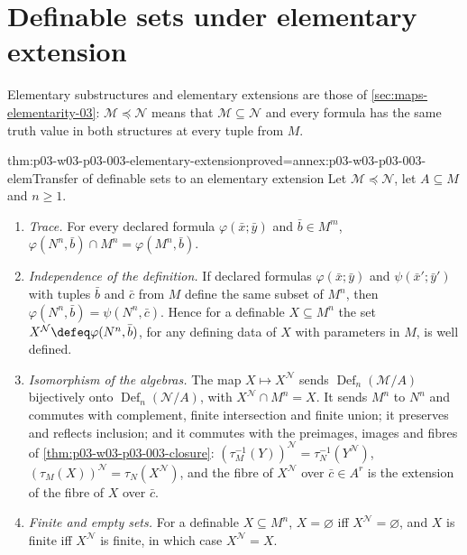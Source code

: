 \section{Definable sets under elementary extension}
\label{sec:p03-w03-p03-003-extension}

Elementary substructures and elementary extensions are those of
\cref{sec:maps-elementarity-03}: \(\mathcal M\preccurlyeq\mathcal N\) means
that \(\mathcal M\subseteq\mathcal N\) and every formula has the same truth
value in both structures at every tuple from \(M\).

\begin{hbtheorem}{thm:p03-w03-p03-003-elementary-extension}{proved=annex:p03-w03-p03-003-elem}{Transfer of definable sets to an elementary extension}
Let \(\mathcal M\preccurlyeq\mathcal N\), let \(A\subseteq M\) and
\(n\geq1\).
\begin{enumerate}
 \item \emph{Trace.}  For every declared formula \(\varphi(\bar x;\bar y)\)
       and \(\bar b\in M^m\),
       \(\varphi(N^n,\bar b)\cap M^n=\varphi(M^n,\bar b)\).
 \item \emph{Independence of the definition.}  If declared formulas
       \(\varphi(\bar x;\bar y)\) and \(\psi(\bar x';\bar y')\) with tuples
       \(\bar b\) and \(\bar c\) from \(M\) define the same subset of
       \(M^n\), then \(\varphi(N^n,\bar b)=\psi(N^n,\bar c)\).
       Hence for a definable \(X\subseteq M^n\) the set
       \(X^{\mathcal N}\defeq\varphi(N^n,\bar b)\), for any defining data
       of \(X\) with parameters in \(M\), is well defined.
 \item \emph{Isomorphism of the algebras.}  The map
       \(X\mapsto X^{\mathcal N}\) sends
       \(\operatorname{Def}_n(\mathcal M/A)\) bijectively onto
       \(\operatorname{Def}_n(\mathcal N/A)\), with
       \(X^{\mathcal N}\cap M^n=X\).  It sends \(M^n\) to \(N^n\) and
       commutes with complement, finite intersection and finite union; it
       preserves and reflects inclusion; and it commutes with the preimages,
       images and fibres of \cref{thm:p03-w03-p03-003-closure}:
       \((\tau_M^{-1}(Y))^{\mathcal N}=\tau_N^{-1}(Y^{\mathcal N})\),
       \((\tau_M(X))^{\mathcal N}=\tau_N(X^{\mathcal N})\), and the fibre of
       \(X^{\mathcal N}\) over \(\bar c\in A^r\) is the extension of the
       fibre of \(X\) over \(\bar c\).
 \item \emph{Finite and empty sets.}  For a definable
       \(X\subseteq M^n\), \(X=\varnothing\) iff
       \(X^{\mathcal N}=\varnothing\), and \(X\) is finite iff
       \(X^{\mathcal N}\) is finite, in which case \(X^{\mathcal N}=X\).
\end{enumerate}
\end{hbtheorem}

